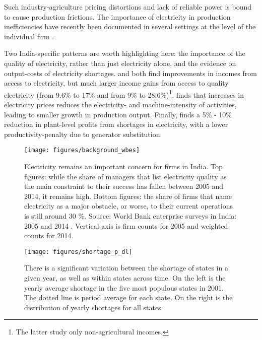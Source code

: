 \documentclass[11pt]{article}
\begin{document}
Such industry-agriculture pricing distortions and lack of reliable power is bound to cause production frictions. The importance of electricity in production inefficiencies have recently been documented in several settings at the level of the individual firm \citep{grainger_impact_2017,abeberese_productivity_2019,fisher-vanden_electricity_2015}. 

Two India-specific patterns are worth highlighting here: the importance of the quality of electricity, rather than just electricity alone, and the evidence on output-costs of electricity shortages. \cite{samad_benefits_2016} and \cite{chakravorty_does_2014} both find improvements in incomes from access to electricity, but much larger income gains from access to quality electricity (from 9.6\% to 17\% and from 9\% to 28.6\%)\footnote{The latter study only non-agricultural incomes.}. \cite{abeberese_electricity_2017} finds that increases in electricity prices reduces the electricity- and machine-intensity of activities, leading to smaller growth in production output. Finally, \cite{allcott_how_2016} finds a 5\% - 10\% reduction in plant-level profits from shortages in electricity, with a lower productivity-penalty due to generator substitution.

\begin{figure}[htpb]
	\centering
	\texttt{[image: figures/background\_wbes]}
	\caption[Enterprise survey: obstacles for firms]{Electricity remains an important concern for firms in India. Top figures: while the share of managers that list electricity quality as the main constraint to their success has fallen between 2005 and 2014, it remains high. Bottom figures: the share of firms that name electricity as a major obstacle, or worse, to their current operations is still around 30 \%. Source: World Bank enterprise surveys in India: 2005 and 2014 \citep{world_bank_enterprise_2020-2,world_bank_enterprise_2020-1}. Vertical axis is firm counts for 2005 and weighted counts for 2014.}
	\label{fig:biggest_obstacle}
\end{figure}

\begin{figure}[htpb]
	\centering
	\label{fig:shortage_p_dl}
	\texttt{[image: figures/shortage\_p\_dl]}
	\caption[Variation in electricity shortages in Indian states]{There is a significant variation between the shortage of states in a given year, as well as within states across time. On the left is the yearly average shortage in the five most populous states in 2001. The dotted line is period average for each state. On the right is the distribution of yearly shortages for all states.}%
	\label{fig:shortage_dist}
\end{figure}
\end{document}
